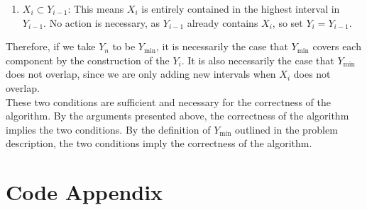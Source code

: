 \documentclass[12pt]{article}
\begin{document}
\begin{enumerate}
\begin{enumerate}
\begin{enumerate}
        \item $X_i \subset Y_{i-1}$: This means $X_i$ is entirely contained in the highest interval in $Y_{i-1}$. No action is necessary, as $Y_{i-1}$ already contains $X_i$, so set $Y_i = Y_{i-1}$.\\
	\end{enumerate}
	
	Therefore, if we take $Y_n$ to be $Y_{\min}$, it is necessarily the case that $Y_{\min}$ covers each component by the construction of the $Y_i$. It is also necessarily the case that $Y_{\min}$ does not overlap, since we are 
only adding new intervals when $X_i$ does not overlap.\\
	
	These two conditions are sufficient and necessary for the correctness of the algorithm. By the arguments presented above, the correctness of the algorithm implies the two conditions. By the definition of $Y_{\min}$ outlined 
in the problem description, the two conditions imply the correctness of the algorithm.
	\end{enumerate}

\end{enumerate}

\newpage
\section*{Code Appendix}
\end{document}
